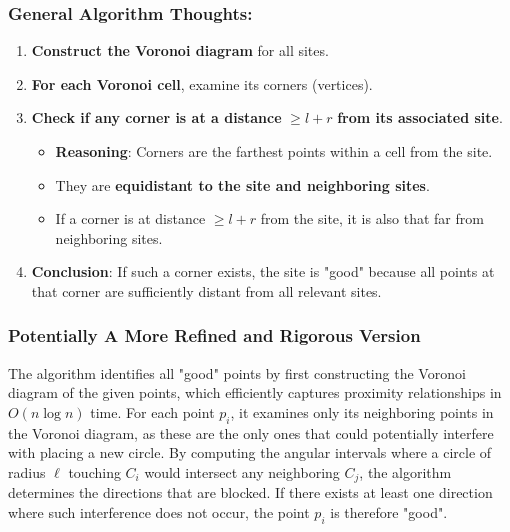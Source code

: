 \documentclass{article}
\begin{document}
\subsubsection*{General Algorithm Thoughts: }
\begin{enumerate}
    \item \textbf{Construct the Voronoi diagram} for all sites.
    \item \textbf{For each Voronoi cell}, examine its corners (vertices).
    \item \textbf{Check if any corner is at a distance} $\geq l + r$ \textbf{from its associated site}.
    \begin{itemize}
        \item \textbf{Reasoning}: Corners are the farthest points within a cell from the site.
        \item They are \textbf{equidistant to the site and neighboring sites}.
        \item If a corner is at distance $\geq l + r$ from the site, it is also that far from neighboring sites.
    \end{itemize}
    \item \textbf{Conclusion}: If such a corner exists, the site is "good" because all points at that corner are sufficiently distant from all relevant sites.
\end{enumerate}

\subsubsection*{Potentially A More Refined and Rigorous Version}
The algorithm identifies all "good" points by first constructing the Voronoi diagram of the given points, which efficiently captures proximity relationships in \( O(n \log n) \) time. 
For each point \( p_i \), it examines only its neighboring points in the Voronoi diagram, as these are the only ones that could potentially interfere with placing a new circle. By computing the angular intervals where a circle of radius \( \ell \) touching \( C_i \) would intersect any neighboring \( C_j \), 
the algorithm determines the directions that are blocked. If there exists at least one direction where such interference does not occur, the point \( p_i \) is therefore "good".
\end{document}
